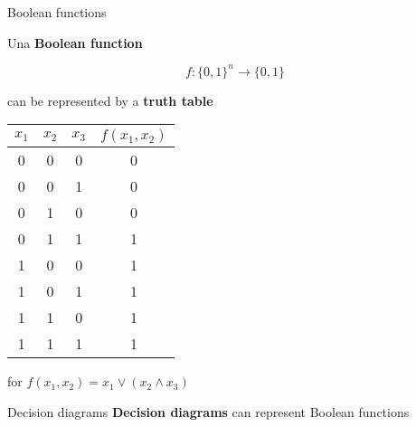 \begin{frame}{Boolean functions}

    Una \textbf{Boolean function}

    $$f : \{0, 1\}^n \to \{0, 1\}$$

    can be represented by a \textbf{truth table}

    \begin{center}
        \begin{tabular}{c|c|c|c}
            $x_1$ & $x_2$ & $x_3$ & $f(x_1, x_2)$ \\
            \hline
            0 & 0 & 0 & 0 \\
            0 & 0 & 1 & 0 \\
            0 & 1 & 0 & 0 \\
            0 & 1 & 1 & 1 \\
            1 & 0 & 0 & 1 \\
            1 & 0 & 1 & 1 \\
            1 & 1 & 0 & 1 \\
            1 & 1 & 1 & 1
        \end{tabular}

        \vspace{1em}
        \small{for $f(x_1, x_2) = x_1 \lor (x_2 \land x_3)$}
    \end{center}
\end{frame}

\begin{frame}{Decision diagrams}
    \textbf{Decision diagrams} can represent Boolean functions

\vspace{1em}
\end{frame}

